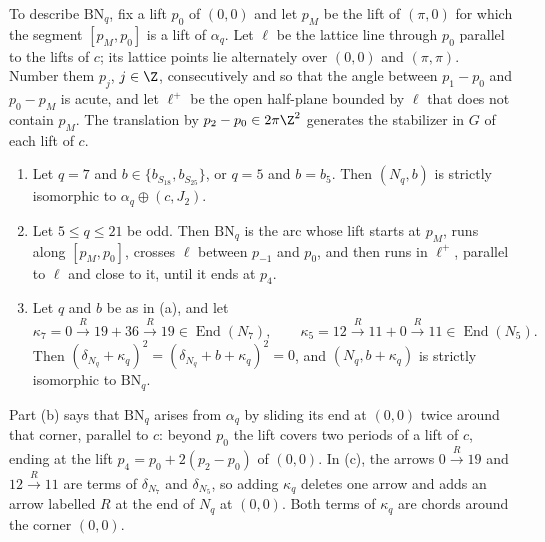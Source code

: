 To describe $\mathrm{BN}_q$, fix a lift $p_0$ of $(0,0)$ and let $p_M$ be the lift of $(\pi,0)$ for
which the segment $[p_M,p_0]$ is a lift of $\alpha_q$.  Let $\ell$ be the lattice line through $p_0$
parallel to the lifts of $c$; its lattice points lie alternately over $(0,0)$ and $(\pi,\pi)$.  Number them $p_j$,
$j\in\Z$, consecutively and so that the angle between $p_1-p_0$ and $p_0-p_M$ is acute, and let
$\ell^+$ be the open half-plane bounded by $\ell$ that does not contain $p_M$.  The translation by
$p_2-p_0\in2\pi\Z^2$ generates the stabilizer in $G$ of each lift of $c$.

\begin{theorem}\label{thm:structure-full}
\begin{enumerate}
\item[(a)] Let $q=7$ and $b\in\{b_{S_{18}},b_{S_{25}}\}$, or $q=5$ and $b=b_5$.  Then $(N_q,b)$ is
 strictly isomorphic to $\alpha_q\oplus(c,J_2)$.
\item[(b)] Let $5\le q\le21$ be odd.  Then $\mathrm{BN}_q$ is the arc whose lift starts at $p_M$, runs
 along $[p_M,p_0]$, crosses $\ell$ between $p_{-1}$ and $p_0$, and then runs in $\ell^+$, parallel to
 $\ell$ and close to it, until it ends at $p_4$.
\item[(c)] Let $q$ and $b$ be as in (a), and let
 \[
  \kappa_7=0\xrightarrow R19+36\xrightarrow R19\in\operatorname{End}(N_7),\qquad
  \kappa_5=12\xrightarrow R11+0\xrightarrow R11\in\operatorname{End}(N_5).
 \]
 Then $(\delta_{N_q}+\kappa_q)^2=(\delta_{N_q}+b+\kappa_q)^2=0$, and $(N_q,b+\kappa_q)$ is strictly
 isomorphic to $\mathrm{BN}_q$.
\end{enumerate}
\end{theorem}

Part (b) says that $\mathrm{BN}_q$ arises from $\alpha_q$ by sliding its end at $(0,0)$ twice around
that corner, parallel to $c$: beyond $p_0$ the lift covers two periods of a lift of $c$, ending at
the lift $p_4=p_0+2(p_2-p_0)$ of $(0,0)$.  In (c), the arrows $0\xrightarrow R19$ and
$12\xrightarrow R11$ are terms of $\delta_{N_7}$ and $\delta_{N_5}$, so adding $\kappa_q$ deletes one
arrow and adds an arrow labelled $R$ at the end of $N_q$ at $(0,0)$.  Both terms of $\kappa_q$ are
chords around the corner $(0,0)$.

